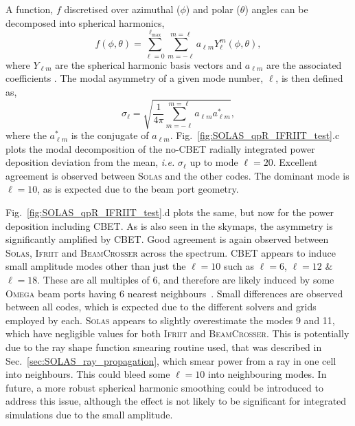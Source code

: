 A function, $f$ discretised over azimuthal ($\phi$) and polar ($\theta$) angles can be decomposed into spherical harmonics,
\begin{equation}
    f(\phi,\theta) = \sum_{\ell=0}^{\ell_{\text{max}}} \sum_{m=-\ell}^{m=\ell} a_{\ell m} Y_{\ell}^{m}(\phi,\theta),
\end{equation}
where $Y_{\ell m}$ are the spherical harmonic basis vectors and $a_{\ell m}$ are the associated coefficients \cite{colaitis_3d_2023}.
The modal asymmetry of a given mode number, $\ell$, is then defined as,
\begin{equation}
    \sigma_{\ell} = \sqrt{ \frac{1}{4\pi} \sum_{m=-\ell}^{m=\ell} a_{\ell m} a^*_{\ell m} },
\end{equation}
where the $a^*_{\ell m}$ is the conjugate of $a_{\ell m}$.
Fig.~\ref{fig:SOLAS_qpR_IFRIIT_test}.c plots the modal decomposition of the no-\ac{CBET} radially integrated power deposition deviation from the mean, \textit{i.e.} $\sigma_{\ell}$ up to mode $\ell=20$.
Excellent agreement is observed between \textsc{Solas} and the other codes.
The dominant mode is $\ell=10$, as is expected due to the beam port geometry.

Fig.~\ref{fig:SOLAS_qpR_IFRIIT_test}.d plots the same, but now for the power deposition including \ac{CBET}.
As is also seen in the skymaps, the asymmetry is significantly amplified by \ac{CBET}.
Good agreement is again observed between \textsc{Solas}, \textsc{Ifriit} and \textsc{BeamCrosser} across the spectrum.
\ac{CBET} appears to induce small amplitude modes other than just the $\ell=10$ such as $\ell=6$, $\ell=12$ \& $\ell=18$.
These are all multiples of 6, and therefore are likely induced by some \textsc{Omega} beam ports having 6 nearest neighbours~\cite{boehly_upgrade_1995,simon_lle_1989}.
Small differences are observed between all codes, which is expected due to the different solvers and grids employed by each.
\textsc{Solas} appears to slightly overestimate the modes 9 and 11, which have negligible values for both \textsc{Ifriit} and \textsc{BeamCrosser}.
This is potentially due to the ray shape function smearing routine used, that was described in Sec.~\ref{sec:SOLAS_ray_propagation}, which smear power from a ray in one cell into neighbours.
This could bleed some $\ell=10$ into neighbouring modes.
In future, a more robust spherical harmonic smoothing could be introduced to address this issue, although the effect is not likely to be significant for integrated simulations due to the small amplitude.

